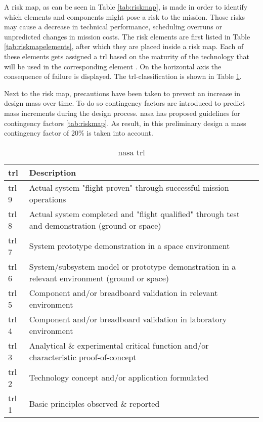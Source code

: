 A risk map, as can be seen in Table \ref{tab:riskmap}, is made in order to identify which elements and components might pose a risk to the mission. Those risks may cause a decrease in technical performance, scheduling overruns or unpredicted changes in mission costs. The risk elements are first listed in Table \ref{tab:riskmapelements}, after which they are placed inside a risk map. Each of these elements gets assigned a \gls{trl} based on the maturity of the technology that will be used in the corresponding element \cite{NASA2007}. On the horizontal axis the consequence of failure is displayed. The \gls{trl}-classification is shown in Table \ref{tab:trls}.

Next to the risk map, precautions have been taken to prevent an increase in design mass over time. To do so contingency factors are introduced to predict mass increments during the design process. \gls{nasa} has proposed guidelines for contingency factors \ref{tab:riskmap}. As result, in this preliminary design a mass contingency factor of 20\% is taken into account.

\begin{table}[h]
	\caption[\acrshort{nasa} \acrlong{trl}]{\acrshort{nasa} \acrlong{trl} \cite{NASA2007}}
	\begin{tabular}{|p{}|p{}|}
		\hline
		\textbf{\acrfull{trl}} & \textbf{Description} \\ \hline \hline
		\gls{trl} 9& Actual system "flight proven" through successful mission operations\\
		\gls{trl} 8& Actual system completed and "flight qualified" through test and demonstration (ground or space)\\
		\gls{trl} 7& System prototype demonstration in a space environment\\
		\gls{trl} 6& System/subsystem model or prototype demonstration in a relevant environment (ground or space)\\
		\gls{trl} 5& Component and/or breadboard validation in relevant environment\\
		\gls{trl} 4& Component and/or breadboard validation in laboratory environment\\
		\gls{trl} 3& Analytical \& experimental critical function and/or characteristic proof-of-concept\\
		\gls{trl} 2& Technology concept and/or application formulated\\
		\gls{trl} 1& Basic principles observed \& reported \\
		\hline
	\end{tabular}
	\label{tab:trls}
\end{table}


